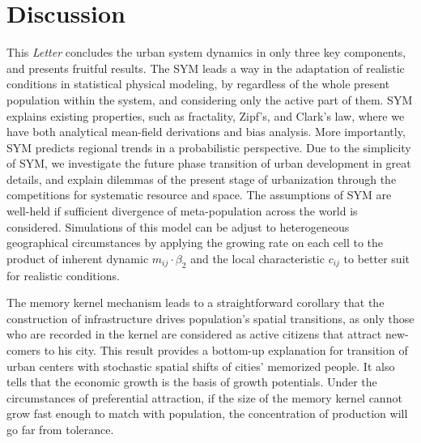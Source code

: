 \documentclass[reprint,unsortedaddress,amsmath,amssymb,aps,prl,showkeys]{revtex4-2}
\begin{document}
\section{Discussion}
This \emph{Letter} concludes the urban system dynamics in only three key components, and presents fruitful results. The SYM leads a way in the adaptation of realistic conditions in statistical physical modeling, by regardless of the whole present population within the system, and considering only the active part of them. SYM explains existing properties, such as fractality, Zipf's, and Clark's law, where we have both analytical mean-field derivations and bias analysis. More importantly, SYM predicts regional trends in a probabilistic perspective. Due to the simplicity of SYM, we investigate the future phase transition of urban development in great details, and explain dilemmas of the present stage of urbanization through the competitions for systematic resource and space. The assumptions of SYM are well-held if sufficient divergence of meta-population across the world is considered. Simulations of this model can be adjust to heterogeneous geographical circumstances by applying the growing rate on each cell to the product of inherent dynamic $m_{ij}\cdot \beta_2$ and the local characteristic $c_{ij}$ to better suit for realistic conditions.

The memory kernel mechanism leads to a straightforward corollary that the construction of infrastructure drives population's spatial transitions, as only those who are recorded in the kernel are considered as active citizens that attract new-comers to his city. This result provides a bottom-up explanation for transition of urban centers with stochastic spatial shifts of cities' memorized people. It also tells that the economic growth is the basis of growth potentials. Under the circumstances of preferential attraction, if the size of the memory kernel cannot grow fast enough to match with population, the concentration of production will go far from tolerance. 
\end{document}
